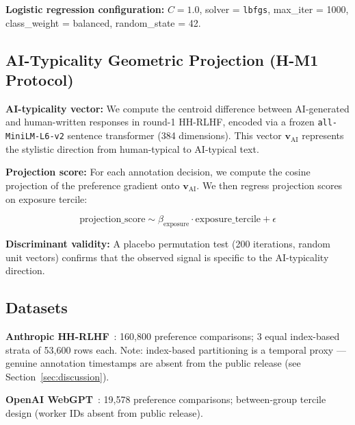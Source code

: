 \textbf{Logistic regression configuration:} $C = 1.0$, solver = \texttt{lbfgs}, max\_iter = 1000, class\_weight = balanced, random\_state = 42.

\subsection{AI-Typicality Geometric Projection (H-M1 Protocol)}

\textbf{AI-typicality vector:} We compute the centroid difference between AI-generated and human-written responses in round-1 HH-RLHF, encoded via a frozen \texttt{all-MiniLM-L6-v2} sentence transformer (384 dimensions). This vector $\mathbf{v}_\text{AI}$ represents the stylistic direction from human-typical to AI-typical text.

\textbf{Projection score:} For each annotation decision, we compute the cosine projection of the preference gradient onto $\mathbf{v}_\text{AI}$. We then regress projection scores on exposure tercile:

\begin{equation}
\text{projection\_score} \sim \beta_{\text{exposure}} \cdot \text{exposure\_tercile} + \epsilon
\end{equation}

\textbf{Discriminant validity:} A placebo permutation test (200 iterations, random unit vectors) confirms that the observed signal is specific to the AI-typicality direction.

\subsection{Datasets}
\label{sec:datasets}

\textbf{Anthropic HH-RLHF}~\citep{Bai2022Training}: 160,800 preference comparisons; 3 equal index-based strata of 53,600 rows each. Note: index-based partitioning is a temporal proxy --- genuine annotation timestamps are absent from the public release (see Section~\ref{sec:discussion}).

\textbf{OpenAI WebGPT}~\citep{Stiennon2020Learning}: 19,578 preference comparisons; between-group tercile design (worker IDs absent from public release).
